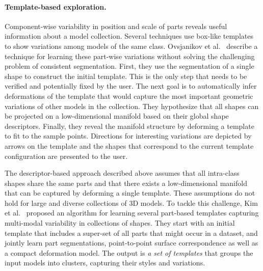\paragraph*{Template-based exploration.}
Component-wise variability in position and scale of parts reveals useful information about a model collection. Several techniques use box-like templates to show variations among models of the same class. Ovsjanikov et al.~\cite{Ovsjanikov:2011:ECV} describe a technique for learning these part-wise variations without solving the challenging problem of consistent segmentation. First, they use the segmentation of a single shape to construct the initial template. This is the only step that needs to be verified and potentially fixed by the user. The next goal is to automatically infer deformations of the template that would capture the most important geometric variations of other models in the collection.  They hypothesize that all shapes can be projected on a low-dimensional manifold based on their global shape descriptors. Finally, they reveal the manifold structure by deforming a template to fit to the sample points. Directions for interesting variations are depicted by arrows on the template and the shapes that correspond to the current template configuration are presented to the user.%

The descriptor-based approach described above assumes that all intra-class shapes share the same parts and that there exists a low-dimensional manifold that can be captured by deforming a single template. These assumptions do not hold for large and diverse collections of 3D models.  To tackle this challenge, Kim et al.~\cite{Kim:2013:lpt} proposed an algorithm for learning several part-based templates capturing multi-modal variability in collections of shapes. They start with an initial template that includes a super-set of all parts that might occur in a dataset, and jointly learn part segmentations, point-to-point surface correspondence as well as a compact deformation model. The output is \emph{a set of templates} that groups the input models into clusters, capturing their styles and variations.

